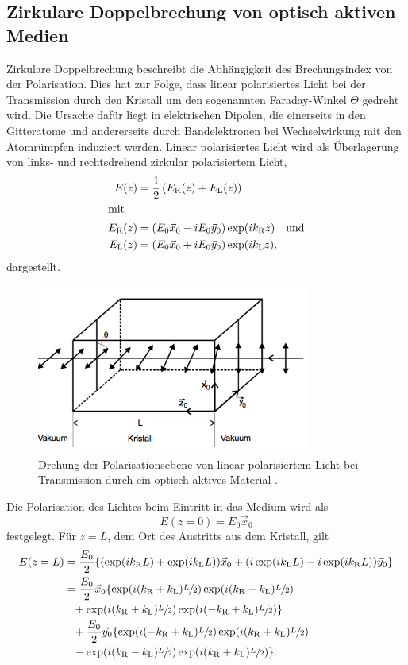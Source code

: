 \subsection{Zirkulare Doppelbrechung von optisch aktiven Medien}
\label{sec:doppel_aktiv}
Zirkulare Doppelbrechung beschreibt die Abhängigkeit des Brechungsindex von der Polarisation. Dies hat zur Folge, dass
linear polarisiertes Licht bei der Transmission durch den Kristall um den sogenannten Faraday-Winkel $\Theta$ gedreht wird.
Die Ursache dafür liegt in elektrischen Dipolen, die einerseits in den Gitteratome und
andererseits durch Bandelektronen bei Wechselwirkung mit den Atomrümpfen induziert werden.
Linear polarisiertes Licht wird als Überlagerung von links- und rechtsdrehend zirkular polarisiertem Licht,
\begin{align}
    E(z) &= \frac{1}{2} \left(E_\text{R}(z)+E_\text{L}(z)\right)\\
    \shortintertext{mit}
    E_\text{R}(z) &= (E_0 \vec x_0 - i E_0 \vec y_0) \exp(ik_\text{R}z)\quad\text{und}\\
    E_\text{L}(z) &= (E_0 \vec x_0 + i E_0 \vec y_0) \exp(ik_\text{L}z),
\end{align}
dargestellt.
\begin{figure}[h]
    \centering
    \includegraphics[width=0.8\textwidth]{graphics/drehung.png}
    \caption{Drehung der Polarisationsebene von linear polarisiertem Licht bei Transmission durch ein optisch aktives Material \cite{skript}.}
    \label{fig:drehung}
\end{figure}
Die Polarisation des Lichtes beim Eintritt in das Medium wird als
\begin{equation}
    E(z=0) = E_0 \vec x_0
\end{equation}
festgelegt.
Für $z = L$, dem Ort des Austritts aus dem Kristall, gilt
\begin{alignat*}{3}
    E(z=L) &= \frac{E_0}{2} \{ (\exp(ik_\text{R}L)+\exp(ik_\text{L}L))\vec x_0 + (i\exp(ik_\text{L}L)-i\exp(ik_\text{R}L))\vec y_0\}\\
    &= \frac{E_0}{2} \vec x_0 \{ \exp(i(k_\text{R}+k_\text{L})\sfrac{L}{2})\exp(i(k_\text{R}-k_\text{L})\sfrac{L}{2}) \\
    &\phantom{=} + \exp(i(k_\text{R}+k_\text{L})\sfrac{L}{2})\exp(i(-k_\text{R}+k_\text{L})\sfrac{L}{2})\}\\
    &\phantom{=}+ \frac{E_0}{2}\vec y_0 \{ \exp(i(-k_\text{R}+k_\text{L})\sfrac{L}{2})\exp(i(k_\text{R}+k_\text{L})\sfrac{L}{2}) \\
    &\phantom{=}- \exp(i(k_\text{R}-k_\text{L})\sfrac{L}{2})\exp(i(k_\text{R}+k_\text{L})\sfrac{L}{2}) \}.
\end{alignat*}
